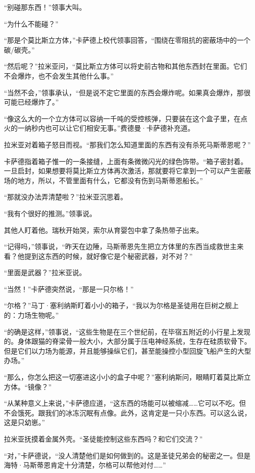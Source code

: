 \documentclass[AutoFakeBold=true]{book}
\begin{document}
``别碰那东西！''领事大叫。

``为什么不能碰？''

``那是个莫比斯立方体，''卡萨德上校代领事回答，``围绕在零阻抗的密蔽场中的一个碳/碳壳。''

``然后呢？''拉米亚问，``莫比斯立方体可以将史前古物和其他东西封在里面。它们不会爆炸，也不会发生其他什么事。''

``当然不会，''领事承认，``但是说不定它里面的东西会爆炸呢。如果真会爆炸，那很可能已经爆炸了。''

``像这么大的一个立方体可以容纳一千吨的受控核弹，只要装在这个盒子里，在点火的一纳秒内也可以让它们相安无事。''费德曼·卡萨德补充道。

拉米亚对着箱子怒目而视。``那我们怎么知道里面的东西有没有杀死马斯蒂恩呢？''

卡萨德指着箱子惟一的一条接缝，上面有条微微闪光的绿色饰带。``箱子密封着。一旦启封，如果想要将莫比斯立方体再次激活，那就要将它拿到一个可以产生密蔽场的地方，所以，不管里面有什么，它都没有伤到马斯蒂恩船长。''

``那就没办法弄清楚啦？''拉米亚沉思着。

``我有个很好的推测。''领事说。

其他人盯着他。瑞秋开始哭，索尔从育婴包中拿了条热带子出来。

``记得吗，''领事说，``昨天在边陲，马斯蒂恩先生把立方体里的东西当成救世主来看？他提到这东西的时候，就好像它是个秘密武器，对不对？''

``里面是武器？''拉米亚说。

``当然！''卡萨德突然说，``那是一只尔格！''

``尔格？''马丁·塞利纳斯盯着小小的箱子，``我以为尔格是圣徒用在巨树之舰上的：力场生物呢。''

``的确是这样，''领事说，``这些生物是在三个世纪前，在毕宿五附近的小行星上发现的。身体跟猫的脊梁骨一般大小，大部分属于压电神经系统，生存在硅质软骨下。但是它们以力场为能源，并且能够操纵它们，甚至能操控小型回旋飞船产生的大型办场。''

``那么，你怎么把这一切塞进这小小的盒子中呢？''塞利纳斯问，眼睛盯着莫比斯立方体。``镜像？''

``从某种意义上来说，''卡萨德应道，``这东西的场能可以被缩减……它可以不吃。但不会饿死。跟我们的冰冻沉眠有点像。此外，这肯定是一只小东西。可以这么说，这是只幼崽。''

拉米亚抚摸着金属外壳。``圣徒能控制这些东西吗？和它们交流？''

``对，''卡萨德说，``没人清楚他们是如何做到的。这是圣徒兄弟会的秘密之一。但是海特·马斯蒂恩肯定十分清楚，尔格可以帮他对付……''
\end{document}
